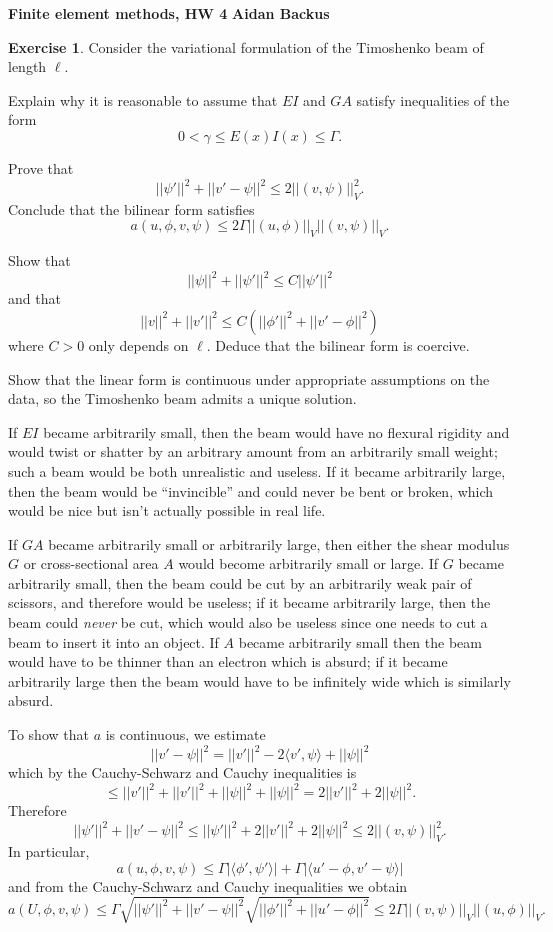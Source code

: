 \documentclass[10pt]{article}
\theoremstyle{definition}
\newtheorem{exer}{Exercise}
\begin{document}
\noindent
\large\textbf{Finite element methods, HW 4} \hfill \textbf{Aidan Backus} \\

\begin{exer}
Consider the variational formulation of the Timoshenko beam of length $\ell$.

Explain why it is reasonable to assume that $EI$ and $GA$ satisfy inequalities of the form
$$0 < \gamma \leq E(x)I(x) \leq \Gamma.$$

Prove that 
$$||\psi'||^2 + ||v' - \psi||^2 \leq 2||(v, \psi)||_V^2.$$
Conclude that the bilinear form satisfies 
$$a(u, \phi, v, \psi) \leq 2\Gamma||(u, \phi)||_V ||(v, \psi)||_V.$$

Show that 
$$||\psi||^2 + ||\psi'||^2 \leq C||\psi'||^2$$
and that 
$$||v||^2 + ||v'||^2 \leq C(||\phi'||^2 + ||v' - \phi||^2)$$
where $C > 0$ only depends on $\ell$.
Deduce that the bilinear form is coercive.

Show that the linear form is continuous under appropriate assumptions on the data, so the Timoshenko beam admits a unique solution.
\end{exer}

If $EI$ became arbitrarily small, then the beam would have no flexural rigidity and would twist or shatter by an arbitrary amount from an arbitrarily small weight; such a beam would be both unrealistic and useless.
If it became arbitrarily large, then the beam would be ``invincible'' and could never be bent or broken, which would be nice but isn't actually possible in real life.

If $GA$ became arbitrarily small or arbitrarily large, then either the shear modulus $G$ or cross-sectional area $A$ would become arbitrarily small or large. If $G$ became arbitrarily small, then the beam could be cut by an arbitrarily weak pair of scissors, and therefore would be useless; if it became arbitrarily large, then the beam could \emph{never} be cut, which would also be useless since one needs to cut a beam to insert it into an object.
If $A$ became arbitrarily small then the beam would have to be thinner than an electron which is absurd; if it became arbitrarily large then the beam would have to be infinitely wide which is similarly absurd.

To show that $a$ is continuous, we estimate  
$$||v' - \psi||^2 = ||v'||^2 - 2\langle v', \psi\rangle + ||\psi||^2$$
which by the Cauchy-Schwarz and Cauchy inequalities is 
$$\leq ||v'||^2 + ||v'||^2 + ||\psi||^2 + ||\psi||^2 = 2||v'||^2 + 2||\psi||^2.$$
Therefore 
$$||\psi'||^2 + ||v' - \psi||^2 \leq ||\psi'||^2 + 2||v'||^2 + 2||\psi||^2 \leq 2||(v, \psi)||_V^2.$$
In particular,
$$a(u, \phi, v, \psi) \leq \Gamma |\langle \phi', \psi'\rangle| + \Gamma |\langle u' - \phi, v' - \psi\rangle|$$
and from the Cauchy-Schwarz and Cauchy inequalities we obtain 
$$a(U, \phi, v, \psi) \leq \Gamma \sqrt{||\psi'||^2 + ||v' - \psi||^2} \sqrt{||\phi'||^2 + ||u' - \phi||^2} \leq 2\Gamma ||(v, \psi)||_V ||(u, \phi)||_V.$$
\end{document}
